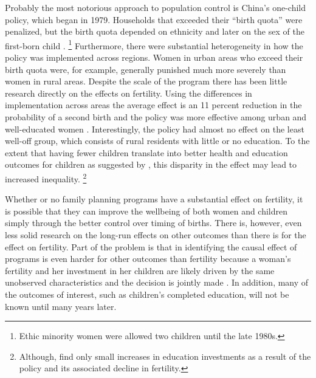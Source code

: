 \documentclass[letterpaper,12pt]{article}
\begin{document}

Probably the most notorious approach to population control is China's
one-child policy, which began in 1979.
Households that exceeded their ``birth quota'' were penalized,
but the birth quota depended on ethnicity and later on the sex
of the first-born child \citep{Li2005}.%
\footnote{
Ethic minority women were allowed two children until the late 1980s.
}
Furthermore, there were substantial heterogeneity in how the policy
was implemented across regions.
Women in urban areas who exceed their birth quota were, for example,
generally punished much more severely than women in rural areas.
Despite the scale of the program there has been little research
directly on the effects on fertility.
Using the differences in implementation across areas the 
average effect is an 11 percent reduction in the probability
of a second birth and the policy was more effective among
urban and well-educated women \citep{Li2005}.
Interestingly, the policy had almost no eﬀect on the least well-oﬀ group,
which consists of rural residents with little or no education. 
To the extent that having fewer children translate into better health
and education outcomes for children as suggested by \citet{becker73}, 
this disparity in the effect may lead to increased inequality.%
\footnote{
Although, \citet{Rosenzweig2009} find only small increases in
education investments as a result of the policy and its associated
decline in fertility.
}




Whether or no family planning programs have a substantial
effect on fertility, it is possible that they can improve the wellbeing 
of both women and children simply through the better control 
over timing of births.
There is, however, even less solid research on the long-run effects on
other outcomes than there is for the effect on fertility.
Part of the problem is that in identifying the causal effect of
programs is even harder for other outcomes than fertility because
a woman's fertility and her investment in her children are likely
driven by the same unobserved characteristics and the decision is
jointly made \citep{Schultz2005}.
In addition, many of the outcomes of interest, such as children's
completed education, will not be known until many years later.
\end{document}

